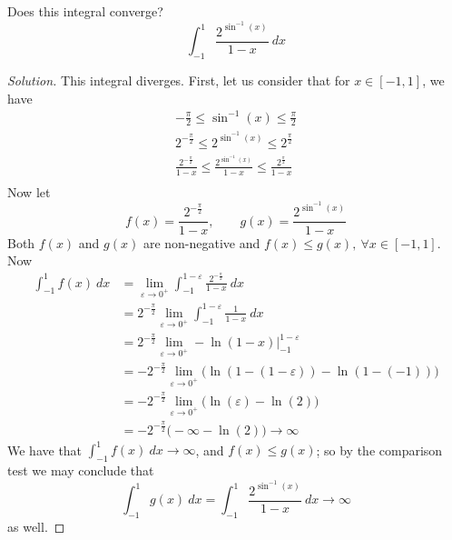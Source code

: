 \documentclass{article}
\newcommand{\parens}[1]{\left(#1\right)}
\newcommand{\vep}{\varepsilon}
\begin{document}
	\item Does this integral converge?
		$$\int_{-1}^1 \frac{2^{\sin^{-1}(x)}}{1-x}\ dx$$
	\begin{proof}[Solution]
	This integral diverges. First, let us consider that for $x \in [-1,1]$, we have
	\begin{align*}
	-\frac{\pi}{2} \leq \sin^{-1}(x) \leq \frac{\pi}{2} \\
	2^{-\frac{\pi}{2}} \leq 2^{\sin^{-1}(x)} \leq 2^{\frac{\pi}{2}} \\
	\frac{2^{-\frac{\pi}{2}}}{1-x} \leq \frac{2^{\sin^{-1}(x)}}{1-x} \leq \frac{2^{\frac{\pi}{2}}}{1-x} \\
	\end{align*}
	Now let 
	$$f(x) = \frac{2^{-\frac{\pi}{2}}}{1-x},\qquad g(x) = \frac{2^{\sin^{-1}(x)}}{1-x}$$
	Both $f(x)$ and $g(x)$ are non-negative and $f(x) \leq g(x),\ \forall x \in [-1,1]$. Now
	\begin{align*}
	\int_{-1}^1 f(x)\ dx &= \lim_{\vep \to 0^+} \int_{-1}^{1-\vep}\frac{2^{-\frac{\pi}{2}}}{1-x}\ dx \\
	&= 2^{-\frac{\pi}{2}}\lim_{\vep \to 0^+} \int_{-1}^{1-\vep}\frac{1}{1-x}\ dx \\
	&= 2^{-\frac{\pi}{2}}\lim_{\vep \to 0^+} -\ln\parens{1-x}\Big|_{-1}^{1-\vep} \\
	&= -2^{-\frac{\pi}{2}}\lim_{\vep \to 0^+} \Big(\ln\parens{1-(1-\vep)} - \ln\parens{1-(-1)}\Big) \\
	&= -2^{-\frac{\pi}{2}}\lim_{\vep \to 0^+} \Big(\ln\parens{\vep} - \ln\parens{2}\Big) \\
	&= -2^{-\frac{\pi}{2}}\Big(-\infty - \ln\parens{2}\Big) \to \infty
	\end{align*}
	We have that $\int_{-1}^1 f(x)\ dx \to \infty$, and $f(x) \leq g(x)$; so by the comparison test we may conclude that 
	$$\int_{-1}^1g(x)\ dx = \int_{-1}^1 \frac{2^{\sin^{-1}(x)}}{1-x}\ dx \to \infty$$
	as well.
	\end{proof}
		
\end{document}
